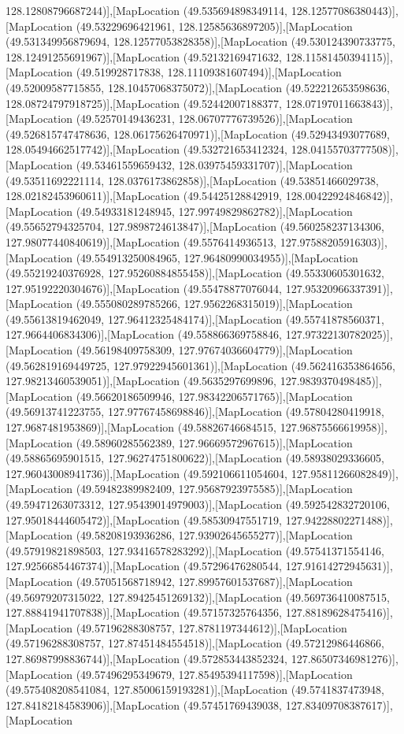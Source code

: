 128.12808796687244)],[MapLocation (49.535694898349114, 128.12577086380443)],[MapLocation (49.53229696421961, 128.12585636897205)],[MapLocation (49.531349956879694, 128.12577053828358)],[MapLocation (49.530124390733775, 128.12491255691967)],[MapLocation (49.52132169471632, 128.11581450394115)],[MapLocation (49.519928717838, 128.11109381607494)],[MapLocation (49.52009587715855, 128.10457068375072)],[MapLocation (49.522212653598636, 128.08724797918725)],[MapLocation (49.52442007188377, 128.07197011663843)],[MapLocation (49.52570149436231, 128.06707776739526)],[MapLocation (49.526815747478636, 128.06175626470971)],[MapLocation (49.52943493077689, 128.05494662517742)],[MapLocation (49.532721653412324, 128.04155703777508)],[MapLocation (49.53461559659432, 128.03975459331707)],[MapLocation (49.53511692221114, 128.0376173862858)],[MapLocation (49.53851466029738, 128.02182453960611)],[MapLocation (49.54425128842919, 128.00422924846842)],[MapLocation (49.54933181248945, 127.99749829862782)],[MapLocation (49.55652794325704, 127.9898724613847)],[MapLocation (49.560258237134306, 127.98077440840619)],[MapLocation (49.5576414936513, 127.97588205916303)],[MapLocation (49.554913250084965, 127.96480990034955)],[MapLocation (49.55219240376928, 127.95260884855458)],[MapLocation (49.55330605301632, 127.95192220304676)],[MapLocation (49.55478877076044, 127.95320966337391)],[MapLocation (49.555080289785266, 127.9562268315019)],[MapLocation (49.55613819462049, 127.96412325484174)],[MapLocation (49.55741878560371, 127.9664406834306)],[MapLocation (49.558866369758846, 127.97322130782025)],[MapLocation (49.56198409758309, 127.97674036604779)],[MapLocation (49.562819169449725, 127.97922945601361)],[MapLocation (49.562416353864656, 127.98213460539051)],[MapLocation (49.5635297699896, 127.9839370498485)],[MapLocation (49.56620186509946, 127.98342206571765)],[MapLocation (49.56913741223755, 127.97767458698846)],[MapLocation (49.57804280419918, 127.9687481953869)],[MapLocation (49.58826746684515, 127.96875566619958)],[MapLocation (49.58960285562389, 127.96669572967615)],[MapLocation (49.58865695901515, 127.96274751800622)],[MapLocation (49.58938029336605, 127.96043008941736)],[MapLocation (49.592106611054604, 127.95811266082849)],[MapLocation (49.59482389982409, 127.95687923975585)],[MapLocation (49.59471263073312, 127.95439014979003)],[MapLocation (49.592542832720106, 127.95018444605472)],[MapLocation (49.58530947551719, 127.94228802271488)],[MapLocation (49.58208193936286, 127.93902645655277)],[MapLocation (49.57919821898503, 127.93416578283292)],[MapLocation (49.57541371554146, 127.92566854467374)],[MapLocation (49.57296476280544, 127.91614272945631)],[MapLocation (49.57051568718942, 127.89957601537687)],[MapLocation (49.56979207315022, 127.89425451269132)],[MapLocation (49.569736410087515, 127.88841941707838)],[MapLocation (49.57157325764356, 127.88189628475416)],[MapLocation (49.57196288308757, 127.8781197344612)],[MapLocation (49.57196288308757, 127.87451484554518)],[MapLocation (49.57212986446866, 127.86987998836744)],[MapLocation (49.572853443852324, 127.86507346981276)],[MapLocation (49.57496295349679, 127.85495394117598)],[MapLocation (49.575408208541084, 127.85006159193281)],[MapLocation (49.5741837473948, 127.84182184583906)],[MapLocation (49.57451769439038, 127.83409708387617)],[MapLocation 